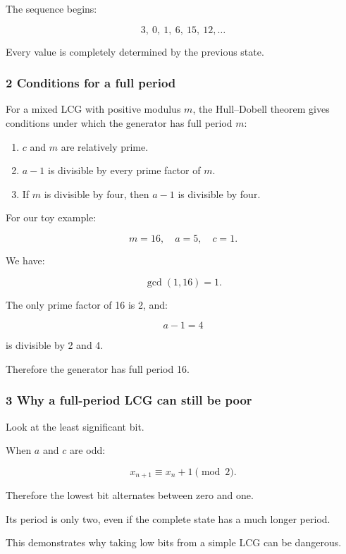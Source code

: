 The sequence begins:

\[
 3,\ 0,\ 1,\ 6,\ 15,\ 12,\ldots
\]

Every value is completely determined by the previous state.

\subsubsection{2 Conditions for a full period}\label{02-foundations-ii-ch029-conditions-for-a-full-period}

For a mixed LCG with positive modulus \(m\), the Hull--Dobell theorem gives conditions under which the generator has full period \(m\):

\begin{enumerate}
\def\labelenumi{\arabic{enumi}.}
\tightlist
\item
  \(c\) and \(m\) are relatively prime.
\item
  \(a-1\) is divisible by every prime factor of \(m\).
\item
  If \(m\) is divisible by four, then \(a-1\) is divisible by four.
\end{enumerate}

For our toy example:

\[
 m=16,\quad a=5,\quad c=1.
\]

We have:

\[
 \gcd(1,16)=1.
\]

The only prime factor of 16 is 2, and:

\[
 a-1=4
\]

is divisible by 2 and 4.

Therefore the generator has full period 16.

\subsubsection{3 Why a full-period LCG can still be poor}\label{02-foundations-ii-ch029-why-a-full-period-lcg-can-still-be-poor}

Look at the least significant bit.

When \(a\) and \(c\) are odd:

\[
 x_{n+1}\equiv x_n+1\pmod2.
\]

Therefore the lowest bit alternates between zero and one.

Its period is only two, even if the complete state has a much longer period.

This demonstrates why taking low bits from a simple LCG can be dangerous.

